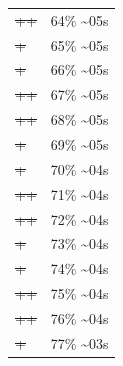 \documentclass[12pt]{article}
\begin{document}
\begin{center}
\begin{tabular}{ll}
\sout{\sout{\sout{\sout{\sout{\sout{\sout{\sout{\sout{\sout{\sout{\sout{\sout{\sout{\sout{++}}}}}}}}}}}}}}} & 64\% \textasciitilde{}05s\\
\sout{\sout{\sout{\sout{\sout{\sout{\sout{\sout{\sout{\sout{\sout{\sout{\sout{\sout{\sout{\sout{+}}}}}}}}}}}}}}}} & 65\% \textasciitilde{}05s\\
\sout{\sout{\sout{\sout{\sout{\sout{\sout{\sout{\sout{\sout{\sout{\sout{\sout{\sout{\sout{\sout{+}}}}}}}}}}}}}}}} & 66\% \textasciitilde{}05s\\
\sout{\sout{\sout{\sout{\sout{\sout{\sout{\sout{\sout{\sout{\sout{\sout{\sout{\sout{\sout{\sout{++}}}}}}}}}}}}}}}} & 67\% \textasciitilde{}05s\\
\sout{\sout{\sout{\sout{\sout{\sout{\sout{\sout{\sout{\sout{\sout{\sout{\sout{\sout{\sout{\sout{++}}}}}}}}}}}}}}}} & 68\% \textasciitilde{}05s\\
\sout{\sout{\sout{\sout{\sout{\sout{\sout{\sout{\sout{\sout{\sout{\sout{\sout{\sout{\sout{\sout{\sout{+}}}}}}}}}}}}}}}}} & 69\% \textasciitilde{}05s\\
\sout{\sout{\sout{\sout{\sout{\sout{\sout{\sout{\sout{\sout{\sout{\sout{\sout{\sout{\sout{\sout{\sout{+}}}}}}}}}}}}}}}}} & 70\% \textasciitilde{}04s\\
\sout{\sout{\sout{\sout{\sout{\sout{\sout{\sout{\sout{\sout{\sout{\sout{\sout{\sout{\sout{\sout{\sout{++}}}}}}}}}}}}}}}}} & 71\% \textasciitilde{}04s\\
\sout{\sout{\sout{\sout{\sout{\sout{\sout{\sout{\sout{\sout{\sout{\sout{\sout{\sout{\sout{\sout{\sout{++}}}}}}}}}}}}}}}}} & 72\% \textasciitilde{}04s\\
\sout{\sout{\sout{\sout{\sout{\sout{\sout{\sout{\sout{\sout{\sout{\sout{\sout{\sout{\sout{\sout{\sout{\sout{+}}}}}}}}}}}}}}}}}} & 73\% \textasciitilde{}04s\\
\sout{\sout{\sout{\sout{\sout{\sout{\sout{\sout{\sout{\sout{\sout{\sout{\sout{\sout{\sout{\sout{\sout{\sout{+}}}}}}}}}}}}}}}}}} & 74\% \textasciitilde{}04s\\
\sout{\sout{\sout{\sout{\sout{\sout{\sout{\sout{\sout{\sout{\sout{\sout{\sout{\sout{\sout{\sout{\sout{\sout{++}}}}}}}}}}}}}}}}}} & 75\% \textasciitilde{}04s\\
\sout{\sout{\sout{\sout{\sout{\sout{\sout{\sout{\sout{\sout{\sout{\sout{\sout{\sout{\sout{\sout{\sout{\sout{++}}}}}}}}}}}}}}}}}} & 76\% \textasciitilde{}04s\\
\sout{\sout{\sout{\sout{\sout{\sout{\sout{\sout{\sout{\sout{\sout{\sout{\sout{\sout{\sout{\sout{\sout{\sout{\sout{+}}}}}}}}}}}}}}}}}}} & 77\% \textasciitilde{}03s\\

\end{tabular}
\end{center}
\end{document}
